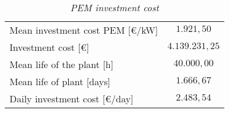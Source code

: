 \begin{table}[H]
\centering
\begin{tabular}{|cc|}
\hline
\rowcolor{bluepoli!40}\multicolumn{2}{|c|}{\textbf{PEM investment}}        \\ \hline
\multicolumn{1}{|l|}{Mean investment cost PEM {[}€/kW{]}} & $1.921,50$     \\ \hline
\multicolumn{1}{|l|}{Investment cost {[}€{]}}             & $4.139.231,25$ \\ \hline
\multicolumn{1}{|l|}{Mean life of the plant {[}h{]}}      & $40.000,00$    \\ \hline
\multicolumn{1}{|l|}{Mean life of plant {[}days{]}}       & $1.666,67$     \\ \hline
\multicolumn{1}{|l|}{Daily investment cost {[}€/day{]}}   & $2.483,54$     \\ \hline
\end{tabular}
\caption{\textit{PEM investment cost \textsuperscript{\cite{pianoidrogeno,dnvgl,guanda20211}}}}
\label{tab:crodoelectro}
\end{table}